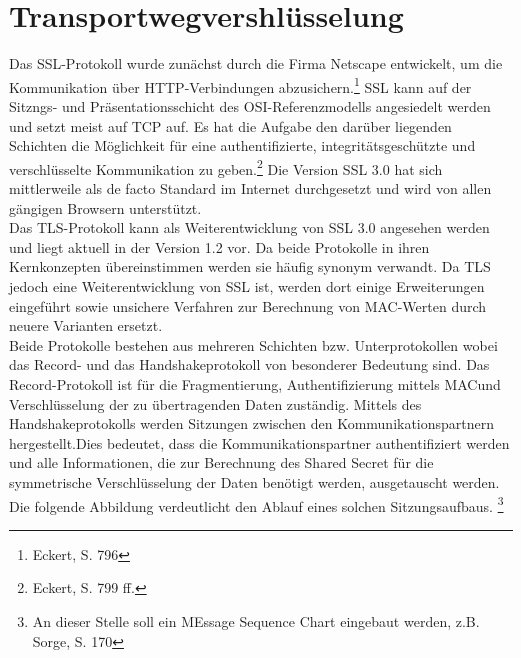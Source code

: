 \chapter{Transportwegvershlüsselung}
	Das \ac{SSL}-Protokoll wurde zunächst durch die Firma Netscape entwickelt, um die Kommunikation über \ac{HTTP}-Verbindungen abzusichern.\footnote{Eckert, S. 796} \ac{SSL} kann auf der Sitzngs- und Präsentationsschicht des \ac{OSI}-Referenzmodells angesiedelt werden und setzt meist auf \ac{TCP} auf. Es hat die Aufgabe den darüber liegenden Schichten die Möglichkeit für eine authentifizierte, integritätsgeschützte und verschlüsselte Kommunikation zu geben.\footnote{Eckert, S. 799 ff.}
	Die Version \ac{SSL} 3.0 hat sich mittlerweile als de facto Standard im Internet durchgesetzt und wird von allen gängigen Browsern unterstützt.\\
	Das \ac{TLS}-Protokoll kann als Weiterentwicklung von \ac{SSL}  3.0 angesehen werden und liegt aktuell in der Version 1.2 vor. Da beide Protokolle in ihren Kernkonzepten übereinstimmen werden sie häufig synonym verwandt. Da \ac{TLS} jedoch eine Weiterentwicklung von \ac{SSL} ist, werden dort einige Erweiterungen eingeführt sowie unsichere Verfahren zur Berechnung von \ac{MAC}-Werten durch neuere Varianten ersetzt.\\
	Beide Protokolle bestehen aus mehreren Schichten bzw. Unterprotokollen wobei das Record- und das Handshakeprotokoll von besonderer Bedeutung sind. Das Record-Protokoll ist für die Fragmentierung, Authentifizierung mittels \ac{MAC}und Verschlüsselung der zu übertragenden Daten zuständig. Mittels des Handshakeprotokolls werden Sitzungen zwischen den Kommunikationspartnern hergestellt.Dies bedeutet, dass die Kommunikationspartner authentifiziert werden und alle Informationen, die zur Berechnung des Shared Secret für die symmetrische Verschlüsselung der Daten benötigt werden, ausgetauscht werden. Die folgende Abbildung verdeutlicht den Ablauf eines solchen Sitzungsaufbaus. \footnote{An dieser Stelle soll ein MEssage Sequence Chart eingebaut werden, z.B. Sorge, S. 170}\\
	